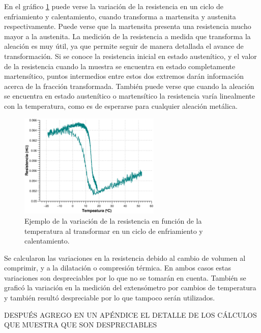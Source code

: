 \documentclass[a4paper,12pt,fleqn,twoside,openany]{book}
\begin{document}
En el gráfico \ref{fig:RvsTClavo5} puede verse la variación de la resistencia en un ciclo de enfriamiento y calentamiento, cuando transforma a martensita y austenita respectivamente. Puede verse que la martensita presenta una resistencia mucho mayor a la austenita. La medición de la resistencia a medida que transforma la aleación es muy útil, ya que permite seguir 
de manera detallada el avance de transformación. Si se conoce la resistencia inicial en estado austenítico, y el valor de la resistencia cuando la 
muestra se encuentra en estado completamente martensítico, puntos intermedios entre estos dos extremos darán información acerca de la fracción transformada.
También puede verse que cuando la aleación se encuentra en estado austenítico o martensítico la resistencia varía linealmente con la temperatura, como es 
de esperarse para cualquier aleación metálica. 

\begin{figure}[h]
 \centering
 \includegraphics[width=0.6\textwidth]{Img/Resultados/RvsTClavo5.eps}
 \caption{Ejemplo de la variación de la resistencia en función de la temperatura al transformar en un ciclo de enfriamiento y calentamiento.} 
 \label{fig:RvsTClavo5}
 \end{figure}

Se calcularon las variaciones en la resistencia debido al cambio de volumen al comprimir, y a la dilatación o compresión térmica. En ambos casos estas 
variaciones son despreciables por lo que no se tomarán en cuenta. También se graficó la variación en la medición del extensómetro por cambios de 
temperatura y también resultó despreciable por lo que tampoco serán utilizados. 



DESPUÉS AGREGO EN UN APÉNDICE EL DETALLE DE LOS CÁLCULOS QUE MUESTRA QUE SON DESPRECIABLES






\end{document}
